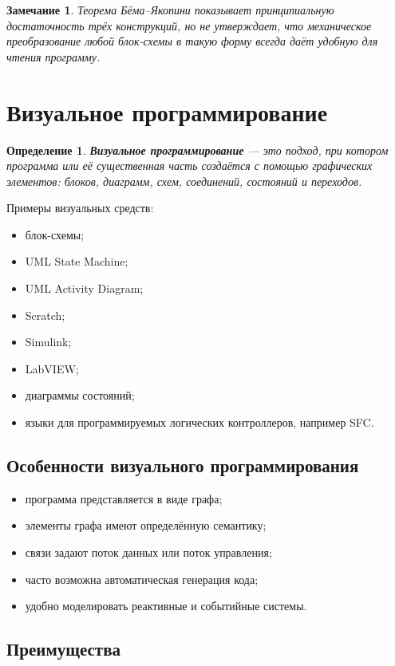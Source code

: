 \documentclass[12pt,a4paper]{article}
\newtheorem{definition}{Определение}
\newtheorem{remark}{Замечание}
\begin{document}
\begin{remark}
Теорема Бёма--Якопини показывает принципиальную достаточность трёх конструкций, но не утверждает, что механическое преобразование любой блок-схемы в такую форму всегда даёт удобную для чтения программу.
\end{remark}

\section{Визуальное программирование}

\begin{definition}
\textbf{Визуальное программирование} --- это подход, при котором программа или её существенная часть создаётся с помощью графических элементов: блоков, диаграмм, схем, соединений, состояний и переходов.
\end{definition}

Примеры визуальных средств:
\begin{itemize}
    \item блок-схемы;
    \item UML State Machine;
    \item UML Activity Diagram;
    \item Scratch;
    \item Simulink;
    \item LabVIEW;
    \item диаграммы состояний;
    \item языки для программируемых логических контроллеров, например SFC.
\end{itemize}

\subsection{Особенности визуального программирования}

\begin{itemize}
    \item программа представляется в виде графа;
    \item элементы графа имеют определённую семантику;
    \item связи задают поток данных или поток управления;
    \item часто возможна автоматическая генерация кода;
    \item удобно моделировать реактивные и событийные системы.
\end{itemize}

\subsection{Преимущества}
\end{document}
